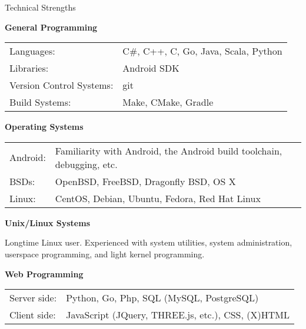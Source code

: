 \documentclass{resume} %
\newcommand{\btab}[2]{
	\bgroup
	\def\arraystretch{#1}
	\begin{tabular}{#2}
}
\newcommand{\etab}{
	\end{tabular} \smallskip
	\egroup
}
\begin{document}
\begin{rSection}{Technical Strengths}

{\bf General Programming}

\btab{1.1}{ l l }
	Languages: &  C\#, C++, C, Go, Java, Scala, Python \\
	Libraries: & Android SDK \\
	Version Control Systems: & git \\
	Build Systems: & Make, CMake, Gradle \\
\etab

{\bf Operating Systems}

\btab{1.1}{ l l }
	Android: & Familiarity with Android, the Android build toolchain, debugging, etc. \\
	BSDs: & OpenBSD, FreeBSD, Dragonfly BSD, OS X \\
	Linux: & CentOS, Debian, Ubuntu, Fedora, Red Hat Linux \\
\etab

{\bf Unix/Linux Systems}

Longtime Linux user. Experienced with system utilities, system administration,
userspace programming, and light kernel programming.

{\bf Web Programming}

\btab{1.1}{ l l }
	Server side: & Python, Go, Php, SQL (MySQL, PostgreSQL) \\
	Client side: & JavaScript (JQuery, THREE.js, etc.), CSS, (X)HTML \\
\etab

\end{rSection}
\end{document}
